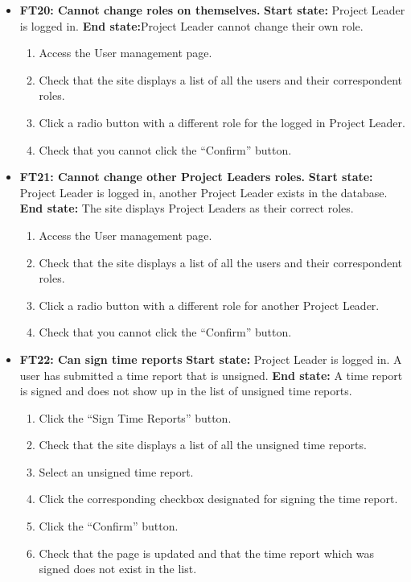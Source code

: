 \documentclass{article}
\begin{document}
\begin{itemize}
		\item \textbf{FT20: Cannot change roles on themselves.} \newline
		\textbf{Start state:} Project Leader is logged in. \newline
		\textbf{End state:}Project Leader cannot change their own role. 
		\begin{enumerate}
			\item Access the User management page.
			\item Check that the site displays a list of all the users and their correspondent roles.
			\item Click a radio button with a different role for the logged in Project Leader.
			\item Check that you cannot click the “Confirm” button. 
		\end{enumerate}
		
		\item \textbf{FT21: Cannot  change other Project Leaders roles.}\newline
		\textbf{Start state:} Project Leader is logged in, another Project Leader exists in the database.  \newline
		\textbf{End state:} The site displays Project Leaders as their correct roles.
		\begin{enumerate}
			\item Access the User management page.
			\item Check that the site displays a list of all the users and their correspondent roles.
			\item Click a radio button with a different role for another Project Leader.
			\item Check that you cannot click the “Confirm” button. 
		\end{enumerate}
		
		\item \textbf{FT22: Can sign time reports}\newline
		\textbf{Start state:} Project Leader is logged in. A user has submitted a time report that is unsigned.  \newline
		\textbf{End state:} A time report is signed and does not show up in the list of unsigned time reports.
		\begin{enumerate}
			\item Click the “Sign Time Reports” button.
			\item Check that the site displays a list of all the unsigned time reports.
			\item Select an unsigned time report.
			\item Click the corresponding checkbox designated for signing the time report.
			\item Click the “Confirm” button.
			\item Check that the page is updated and that the time report which was signed does not exist in the list.
		\end{enumerate}
		

\end{itemize}
\end{document}
